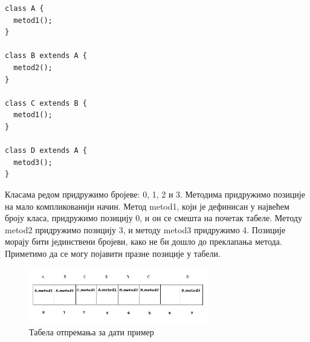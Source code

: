 \documentclass[12pt,oneside]{memoir}
\begin{document}
\begin{enumerate}
\begin{verbatim}
class A {
  metod1();
}

class B extends A {
  metod2();
}

class C extends B {
  metod1();
}

class D extends A {
  metod3();
}
\end{verbatim}

Класама редом придружимо бројеве: 0, 1, 2 и 3. Методима придружимо позиције на мало компликованији начин. Метод metod1, који је дефинисан у највећем броју класа, придружимо позицију 0, и он се смешта на почетак табеле. Методу metod2 придружимо позицију 3, и методу metod3 придружимо 4. Позиције морају бити јединствени бројеви, како не би дошло до преклапања метода. Приметимо да се могу појавити празне позиције у табели.

\begin{figure}[!ht]
  \centering
  \includegraphics[width=0.7\textwidth]{otpremanje.jpg}
  \caption{Табела отпремања за дати пример}
  \label{fig:model}
\end{figure}


\end{enumerate}
\end{document}
